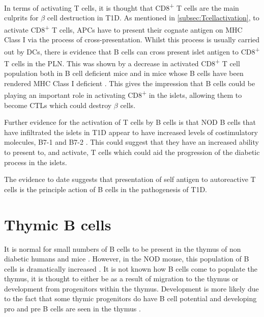 In terms of activating T cells, it is thought that CD8\textsuperscript{+} T cells are the main culprits for $\beta$ cell destruction in T1D.
As mentioned in \cref{subsec:Tcellactivation}, to activate CD8\textsuperscript{+} T cells, APCs have to present their cognate antigen on MHC Class I via the process of cross-presentation.
Whilst this process is usually carried out by DCs, there is evidence that B cells can cross present islet antigen to CD8\textsuperscript{+} T cells in the PLN.
This was shown by a decrease in activated CD8\textsuperscript{+} T cell population both in B cell deficient mice and in mice whose B cells have been rendered MHC Class I deficient \citep{Marino2012}.
This gives the impression that B cells could be playing an important role in activating CD8\textsuperscript{+} in the islets, allowing them to become CTLs which could destroy $\beta$ cells.

Further evidence for the activation of T cells by B cells is that NOD B cells that have infiltrated the islets in T1D appear to have increased levels of costimulatory molecules, B7-1 and B7-2 \citep{Hussain2005}. 
This could suggest that they have an increased ability to present to, and activate, T cells which could aid the progression of the diabetic process in the islets.

The evidence to date suggests that presentation of self antigen to autoreactive T cells is the principle action of B cells in the pathogenesis of T1D.






\section{Thymic B cells}
\label{sec:thymicBcells}
 
It is normal for small numbers of B cells to be present in the thymus of non diabetic humans and mice \citep{Akashi2000, Isaacson1987, Miyama1988}. 
However, in the NOD mouse, this population of B cells is dramatically increased \citep{OReilly1994, Serreze1998}.
It is not known how B cells come to populate the thymus, it is thought to either be as a result of migration to the thymus or development from progenitors within the thymus.
Development is more likely due to the fact that some thymic progenitors do have B cell potential \citep{Porritt2004} and developing pro and pre B cells are seen in the thymus \citep{Akashi2000}.

